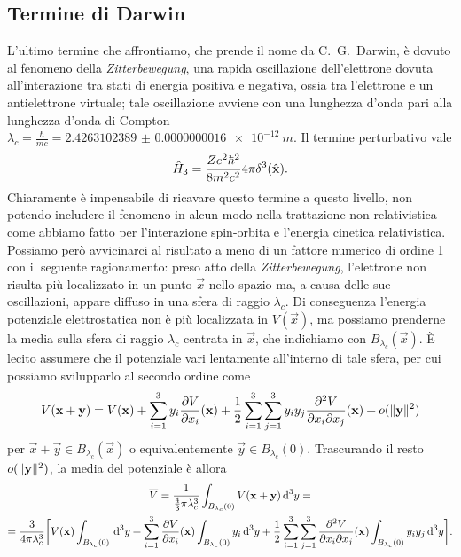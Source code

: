 \subsection{Termine di Darwin}
L'ultimo termine che affrontiamo, che prende il nome da C.~G.~Darwin, è dovuto al fenomeno della \textit{Zitterbewegung}, una rapida oscillazione dell'elettrone dovuta all'interazione tra stati di energia positiva e negativa, ossia tra l'elettrone e un antielettrone virtuale; tale oscillazione avviene con una lunghezza d'onda pari alla lunghezza d'onda di Compton $\lambda_c=\frac{\hbar}{mc}=\SI{2.4263102389(16)e-12}{m}$.
Il termine perturbativo vale
\begin{equation}
    \hat{H}_3=\frac{Ze^2\hbar^2}{8m^2c^2}4\pi\delta^3(\hat{\mathbf{x}}).
    \label{eq:perturbazione-darwin}
\end{equation}
Chiaramente è impensabile di ricavare questo termine a questo livello, non potendo includere il fenomeno in alcun modo nella trattazione non relativistica --- come abbiamo fatto per l'interazione spin-orbita e l'energia cinetica relativistica.
Possiamo però avvicinarci al risultato a meno di un fattore numerico di ordine 1 con il seguente ragionamento: preso atto della \textit{Zitterbewegung}, l'elettrone non risulta più localizzato in un punto $\vec x$ nello spazio ma, a causa delle sue oscillazioni, appare diffuso in una sfera di raggio $\lambda_c$.
Di conseguenza l'energia potenziale elettrostatica non è più localizzata in $V(\vec x)$, ma possiamo prenderne la media sulla sfera di raggio $\lambda_c$ centrata in $\vec x$, che indichiamo con $B_{\lambda_c}(\vec x)$.
È lecito assumere che il potenziale vari lentamente all'interno di tale sfera, per cui possiamo svilupparlo al secondo ordine come
\begin{equation}
    V(\mathbf{x}+\mathbf{y})=V(\mathbf{x})+\sum_{i=1}^3y_i\frac{\partial {V}}{\partial {x_i}}(\mathbf{x})+\frac12\sum_{i=1}^3\sum_{j=1}^3y_iy_j\frac{\partial^2V}{\partial x_i\partial x_j}(\mathbf{x})+o(\lVert\mathbf{y}\rVert^2)
\end{equation}
per $\vec x+\vec y\in B_{\lambda_c}(\vec x)$ o equivalentemente $\vec y\in B_{\lambda_c}(0)$.
Trascurando il resto $o(\lVert\mathbf{y}\rVert^2)$, la media del potenziale è allora
\begin{multline}
    \overline{V}=
    \frac1{\frac43\pi\lambda_c^3}\int_{B_{\lambda_c}(0)} V(\mathbf{x}+\mathbf{y})\,\textup{d}^3y=\\=
    \frac3{4\pi\lambda_c^3}\biggl[V(\mathbf{x})\int_{B_{\lambda_c}(0)}\,\textup{d}^3y+\sum_{i=1}^3\frac{\partial {V}}{\partial {x_i}}(\mathbf{x})\int_{B_{\lambda_c}(0)} y_i\,\textup{d}^3y+\frac12\sum_{i=1}^3\sum_{j=1}^3\frac{\partial^2V}{\partial x_i\partial x_j}(\mathbf{x})\int_{B_{\lambda_c}(0)} y_iy_j\,\textup{d}^3y\biggr].
\end{multline}

